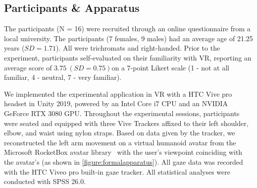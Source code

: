 







\subsection{Participants \& Apparatus}
The participants (N = 16) were recruited through an online questionnaire from a local university. 
The participants (7 females, 9 males) had an average age of 21.25 years ($SD = 1.71$). 
All were trichromats and right-handed. 
Prior to the experiment, participants self-evaluated on their familiarity with VR, reporting an average score of $3.75\ (SD=0.75) $on a 7-point Likert scale (1 - not at all familiar, 4 - neutral, 7 - very familiar).

We implemented the experimental application in VR with a HTC Vive pro headset in Unity 2019, powered by an Intel Core i7 CPU and an NVIDIA GeForce RTX 3080 GPU. 
Throughout the experimental sessions, participants were seated and equipped with three Vive Trackers affixed to their left shoulder, elbow, and waist using nylon straps.
Based on data given by the tracker, we reconstructed the left arm movement on a virtual humanoid avatar from the Microsoft RocketBox avatar library~\cite{gonzalez2020rocketbox} with the user’s viewpoint coinciding with the avatar’s (as shown in \autoref{figure:formalapparatus}).
All gaze data was recorded with the HTC Viveo pro built-in gaze tracker.
All statistical analyses were conducted with SPSS 26.0.

